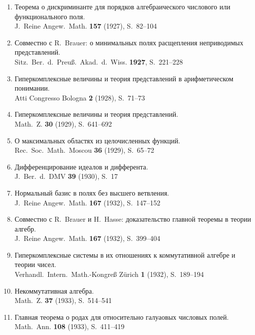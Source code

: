 \documentclass[11pt]{article}
\newcommand{\foreign}[1]{#1}
\begin{document}
\begin{enumerate}[label={\small\arabic*.},leftmargin=2em,itemsep=0.3em]
\item Теорема о дискриминанте для порядков алгебраического числового или функционального поля.\\
\foreign{J.\ Reine Angew.\ Math.} \textbf{157} (1927), S.~82--104

\item Совместно с R.\ Brauer: о минимальных полях расщепления неприводимых представлений.\\
\foreign{Sitz.\ Ber.\ d.\ Preuß.\ Akad.\ d.\ Wiss.} \textbf{1927}, S.~221--228

\item Гиперкомплексные величины и теория представлений в арифметическом понимании.\\
\foreign{Atti Congresso Bologna} \textbf{2} (1928), S.~71--73

\item Гиперкомплексные величины и теория представлений.\\
\foreign{Math.\ Z.} \textbf{30} (1929), S.~641--692

\item О максимальных областях из целочисленных функций.\\
\foreign{Rec.\ Soc.\ Math.\ Moscou} \textbf{36} (1929), S.~65--72

\item Дифференцирование идеалов и дифферента.\\
\foreign{J.\ Ber.\ d.\ DMV} \textbf{39} (1930), S.~17

\item Нормальный базис в полях без высшего ветвления.\\
\foreign{J.\ Reine Angew.\ Math.} \textbf{167} (1932), S.~147--152

\item Совместно с R.\ Brauer и H.\ Hasse: доказательство главной теоремы в теории алгебр.\\
\foreign{J.\ Reine Angew.\ Math.} \textbf{167} (1932), S.~399--404

\item Гиперкомплексные системы в их отношениях к коммутативной алгебре и теории чисел.\\
\foreign{Verhandl.\ Intern.\ Math.-Kongreß Zürich} \textbf{1} (1932), S.~189--194

\item Некоммутативная алгебра.\\
\foreign{Math.\ Z.} \textbf{37} (1933), S.~514--541

\item Главная теорема о родах для относительно галуаовых числовых полей.\\
\foreign{Math.\ Ann.} \textbf{108} (1933), S.~411--419


\end{enumerate}
\end{document}
